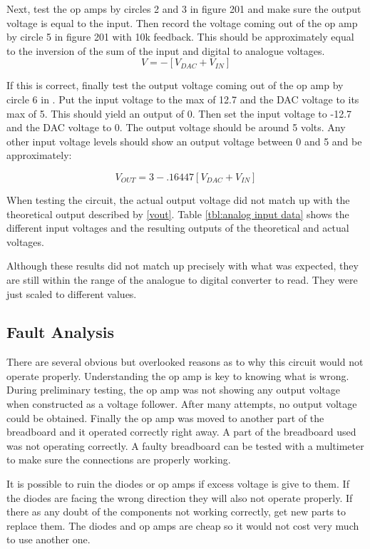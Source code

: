 Next, test the op amps by circles 2 and 3 in figure 201 and make sure the 
output voltage is equal to the input. Then record the voltage coming out of 
the op amp by circle 5 in figure 201 with 10k feedback. This should be 
approximately equal to the inversion of the sum of the input and digital to 
analogue voltages\cite{bk:olia}. \begin{equation} V = -[V_{DAC} + V_{IN}]\end{equation}

If this is correct, finally test the output voltage coming out of the op amp by
 circle 6 in . Put the input voltage to the max of 12.7 and the DAC 
voltage to its max of 5. This should yield an output of 0. Then set the input 
voltage to -12.7 and the DAC voltage to 0. The output voltage should be around 
5 volts. Any other input voltage levels should show an output voltage between 0 and 5 and be approximately:

\begin{equation}\label{vout}V_{OUT} = 3 - .16447[V_{DAC} + V_{IN}]\end{equation}

When testing the circuit, the actual output voltage did not match up with the 
theoretical output described by \eqref{vout}. Table \ref{tbl:analog input data}
 shows the different input voltages and the resulting outputs of the
 theoretical and actual voltages.

Although these results did not match up precisely with what was expected, they 
are still within the range of the analogue to digital converter to read. They 
were just scaled to different values.

\subsection{Fault Analysis}
There are several obvious but overlooked reasons as to why this circuit 
would not operate properly. Understanding the op amp is key to knowing what is
 wrong. During preliminary testing, the op amp was not showing any output
 voltage when constructed as a voltage follower. After many attempts, no output
 voltage could be obtained. Finally the op amp was moved to another part of
 the breadboard and it operated correctly right away. A part of the breadboard
 used was not operating correctly. A faulty breadboard can be tested with a 
multimeter to make sure the connections are properly working.

It is possible to ruin the diodes or op amps if excess voltage is give to
 them. If the diodes are facing the wrong direction they will also not operate
 properly. If there as any doubt of the components not working correctly, get
 new parts to replace them. The diodes and op amps are cheap so it would not 
cost very much to use another one.


